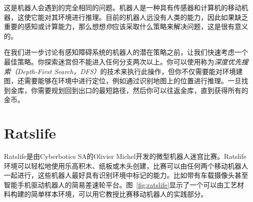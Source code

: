 这是机器人会遇到的完全相同的问题。机器人是一种具有传感器和计算机的移动机器，这使它能对其环境进行推理。目前的机器人远没有人类的能力，因此如果缺乏重要的感知或计算能力，那么想想\emph{你}应该采取什么策略来解决问题，这是很有意义的。


在我们进一步讨论有感知障碍系统的机器人的潜在策略之前，让我们快速考虑一个最佳策略。你探索迷宫但不能进入任何分支两次以上。你可以使用称为\emph{深度优先搜索（Depth-First Search，DFS）}的技术来执行此操作，但你不仅需要能对环境建图，还需要能够在环境中进行定位，例如通过识别地图上的位置进行推理。一旦找到金库，你需要规划回到出口的最短路径，然后你可以往返金库，直到获得所有的金币。

\section{Ratslife}\label{sec:ratslife}

Ratslife是由Cyberbotics SA的Olivier Michel开发的微型机器人迷宫比赛。Ratslife环境可以轻松地使用乐高积木、纸板或木头创建，比赛可以由任何两个移动机器人一起进行，这些机器人最好具有识别环境中标记的能力。比如带有车载摄像头甚至智能手机驱动机器人的简易差速轮平台。图~\ref{fig:ratslife}显示了一个可以由工艺材料构建的简单样本环境，可以用它教授比赛移动机器人的实践部分。

